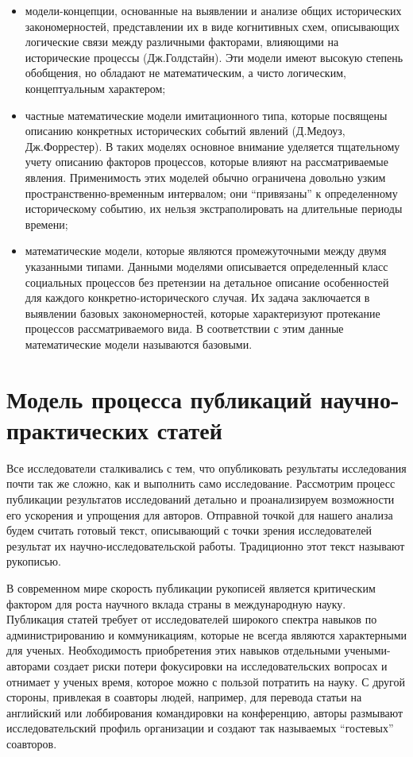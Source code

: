 \begin{itemize}
\tightlist
\item
  модели-концепции, основанные на выявлении и анализе общих исторических закономерностей, представлении их в виде когнитивных схем, описывающих логические связи между различными факторами, влияющими на исторические процессы (Дж.Голдстайн). 
  Эти модели имеют высокую степень обобщения, но обладают не математическим, а чисто логическим, концептуальным характером; 
\item
  частные математические модели имитационного типа, которые посвящены описанию конкретных исторических событий явлений (Д.Медоуз, Дж.Форрестер).
  В таких моделях основное внимание уделяется тщательному учету описанию факторов процессов, которые влияют на рассматриваемые явления.
  Применимость этих моделей обычно ограничена довольно узким пространственно-временным интервалом; они ``привязаны'' к определенному историческому событию, их нельзя экстраполировать на длительные периоды времени; 
\item
  математические модели, которые являются промежуточными между двумя указанными типами. 
  Данными моделями описывается определенный класс социальных процессов без претензии на детальное описание особенностей для каждого конкретно-исторического случая. 
  Их задача заключается в выявлении базовых закономерностей, которые характеризуют протекание процессов рассматриваемого вида.
  В соответствии с этим данные математические модели называются базовыми.
\end{itemize}

\section[Пример модели]{Модель процесса публикаций научно-практических статей}
Все исследователи сталкивались с тем, что опубликовать результаты исследования почти так же сложно, как и выполнить само исследование.
Рассмотрим процесс публикации результатов исследований детально и проанализируем возможности его ускорения и упрощения для авторов.
Отправной точкой для нашего анализа будем считать готовый текст, описывающий с точки зрения исследователей результат их научно-исследовательской работы. 
Традиционно этот текст называют рукописью. 

В современном мире скорость публикации рукописей является критическим фактором для роста научного вклада страны в международную науку.
Публикация статей требует от исследователей широкого спектра навыков по администрированию и коммуникациям, которые не всегда являются характерными для ученых.
Необходимость приобретения этих навыков отдельными учеными-авторами создает риски потери фокусировки на исследовательских вопросах и отнимает у ученых время, которое можно с пользой потратить на науку.
С другой стороны, привлекая в соавторы людей, например, для перевода статьи на английский или лоббирования командировки на конференцию, авторы размывают исследовательский профиль организации и создают так называемых ``гостевых'' соавторов.

